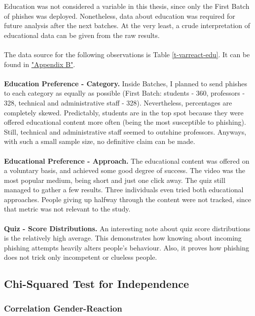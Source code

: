 \documentclass[a4paper]{article}
\begin{document}
Education was not considered a variable in this thesis, since only the First Batch of phishes was deployed. Nonetheless, data about education was required for future analysis after the next batches. At the very least, a crude interpretation of educational data can be given from the raw results.
\\ \\
The data source for the following observations is Table \ref{t-varreact-edu}. It can be found in \hyperlink{appendix-varreact}{"Appendix B"}.
\\ \\
\textbf{Education Preference - Category.} Inside Batches, I planned to send phishes to each category as equally as possible (First Batch: students - 360, professors - 328, technical and administrative staff - 328). Nevertheless, percentages are completely skewed. Predictably, students are in the top spot because they were offered educational content more often (being the most susceptible to phishing). Still, technical and administrative staff seemed to outshine professors. Anyways, with such a small sample size, no definitive claim can be made.
\\ \\
\textbf{Educational Preference - Approach.} The educational content was offered on a voluntary basis, and achieved some good degree of success. The video was the most popular medium, being short and just one click away. The quiz still managed to gather a few results. Three individuals even tried both educational approaches. People giving up halfway through the content were not tracked, since that metric was not relevant to the study.
\\ \\
\textbf{Quiz - Score Distributions.} An interesting note about quiz score distributions is the relatively high average. This demonstrates how knowing about incoming phishing attempts heavily alters people's behaviour. Also, it proves how phishing does not trick only incompetent or clueless people.

\newpage

\subsection{Chi-Squared Test for Independence}

\subsubsection{Correlation Gender-Reaction}
\end{document}
